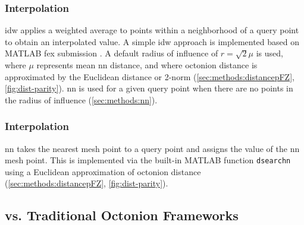 \documentclass[preprint,12pt]{elsarticle}
\begin{document}
\subsubsection{ Interpolation}


\Gls{idw} applies a weighted average to points within a neighborhood of a query point to obtain an interpolated value. A simple \gls{idw} approach is implemented based on MATLAB \gls{fex} submission \cite{tovarInverseDistanceWeight2020}. A default radius of influence of $r=\sqrt{2} \mu$ is used, where $\mu$ represents mean \gls{nn} distance, and where octonion distance is approximated by the Euclidean distance or 2-norm (\cref{sec:methods:distancepFZ}, \cref{fig:dist-parity}). \gls{nn} is used for a given query point when there are no points in the radius of influence (\cref{sec:methods:nn}).

\subsubsection{ Interpolation}


\Gls{nn} takes the nearest mesh point to a query point and assigns the value of the \gls{nn} mesh point. This is implemented via the built-in MATLAB function \texttt{dsearchn} using a Euclidean approximation of octonion distance (\cref{sec:methods:distancepFZ}, \cref{fig:dist-parity}).

\subsection{ vs. Traditional Octonion Frameworks} \label{sec:methods:closed-mesh-comparison}
\end{document}
